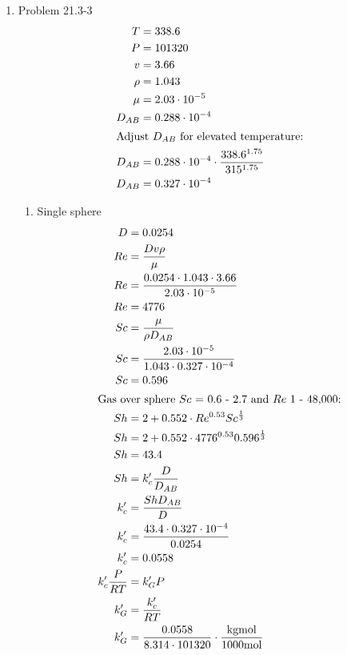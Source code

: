 \documentclass[12pt]{article}
\begin{document}
\begin{enumerate}
\newpage
    \item Problem 21.3-3
    \begin{align*}
        T &= 338.6 \\
        P &= 101320 \\
        v &= 3.66 \\
        \rho &= 1.043 \\
        \mu &= 2.03 \cdot 10^{-5} \\
        D_{AB} &= 0.288 \cdot 10^{-4} \\
        \intertext{Adjust $D_{AB}$ for elevated temperature:}
        D_{AB} &= 0.288 \cdot 10^{-4} \cdot \frac{338.6^{1.75}}{315^{1.75}} \\
        D_{AB} &= 0.327 \cdot 10^{-4}
    \end{align*}
    \begin{enumerate}
        \item Single sphere
        \begin{align*}
            D &= 0.0254 \\
            Re &= \frac{D v \rho}{\mu} \\
            Re &= \frac{0.0254 \cdot 1.043 \cdot 3.66}{2.03 \cdot 10^{-5}} \\
            Re &= 4776 \\   
            Sc &= \frac{\mu}{\rho D_{AB}} \\
            Sc &= \frac{2.03 \cdot 10^{-5}}{1.043 \cdot 0.327 \cdot 10^{-4}} \\
            Sc &= 0.596 \\
            \intertext{Gas over sphere $Sc$ = 0.6 - 2.7 and $Re$ 1 - 48,000:}
            Sh &= 2 + 0.552 \cdot Re^{0.53} Sc^{\frac{1}{3}} \\ 
            Sh &= 2 + 0.552 \cdot 4776^{0.53} 0.596^{\frac{1}{3}} \\
            Sh &= 43.4 \\
            Sh &= k_c' \frac{D}{D_{AB}} \\
            k_c' &= \frac{Sh D_{AB}}{D} \\
            k_c' &= \frac{43.4 \cdot 0.327 \cdot 10^{-4}}{0.0254} \\
            k_c' &= 0.0558 \\
            k_c' \frac{P}{RT} &= k_G' P \\
            k_G' &= \frac{k_c'}{RT} \\
            k_G' &= \frac{0.0558}{8.314 \cdot 101320} \cdot \frac{\mathrm{kgmol}}{1000\mathrm{mol}} \\

\end{align*}
\end{enumerate}
\end{enumerate}
\end{document}
